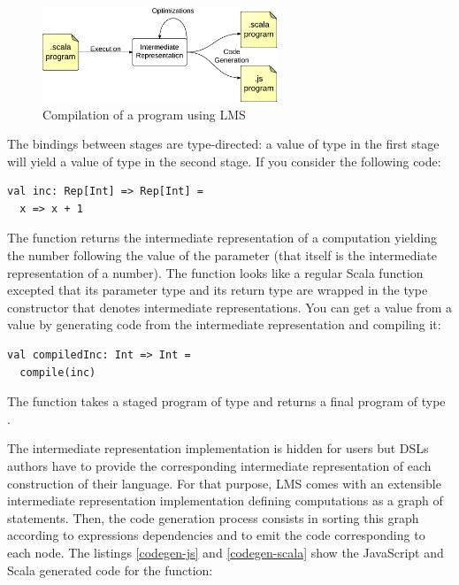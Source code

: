 \documentclass[american,english,runningheads]{llncs}
\begin{document}
\begin{figure}
  \centering
  \includegraphics[width=7cm]{lms.pdf}
  \caption{Compilation of a program using LMS}
  \label{lms-diagram}
\end{figure}

The bindings between stages are type-directed: a value of type  in the first stage will yield a value of type  in the second stage. If you consider the following code:
\begin{lstlisting}
val inc: Rep[Int] => Rep[Int] =
  x => x + 1
\end{lstlisting}
The  function returns the intermediate representation of a computation yielding the number following the value of the parameter  (that itself is the intermediate representation of a number). The function looks like a regular Scala function excepted that its parameter type and its return type are wrapped in the  type constructor that denotes intermediate representations. You can get a  value from a  value by generating code from the intermediate representation and compiling it:
\begin{lstlisting}
val compiledInc: Int => Int =
  compile(inc)
\end{lstlisting}
The  function takes a staged program of type  and returns a final program of type .

The intermediate representation implementation is hidden for users but DSLs authors have to provide the corresponding intermediate representation of each construction of their language. For that purpose, LMS comes with an extensible intermediate representation implementation defining computations as a graph of statements. Then, the code generation process consists in sorting this graph according to expressions dependencies and to emit the code corresponding to each node. The listings \ref{codegen-js} and \ref{codegen-scala} show the JavaScript and Scala generated code for the  function:
\begin{multicols}{2}


\end{multicols}
\end{document}
